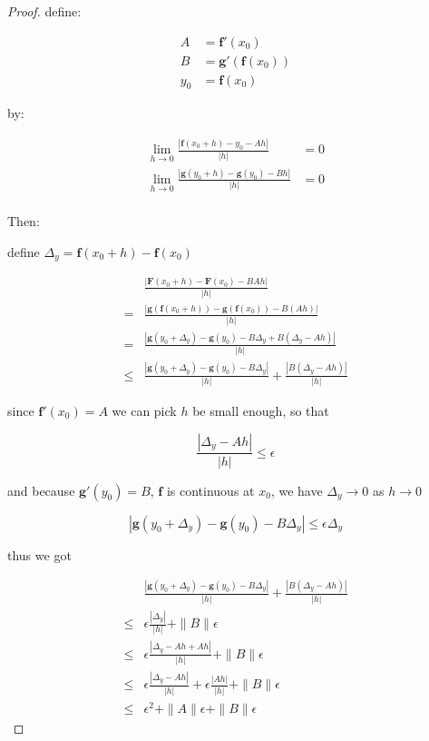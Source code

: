\begin{proof}
    define:
    
    \begin{align*}
        A &= \mathbf{f}'(x_0) \\
        B &= \mathbf{g}'(\mathbf{f}(x_0)) \\
        y_0 &= \mathbf{f}(x_0)
    \end{align*}

    by:

    \begin{align*}
        \lim_{h \to 0} \frac{\left| \mathbf{f}(x_0 + h) - y_0 - Ah \right|}{|h|} &= 0 \\
        \lim_{h \to 0} \frac{\left| \mathbf{g}(y_0 + h) - \mathbf{g}(y_0) - Bh \right|}{|h|} &= 0 \\
    \end{align*}

    Then:

    define $\Delta_y = \mathbf{f}(x_0 + h) - \mathbf{f}(x_0)$

    \begin{align*}
        &\frac{\left|\mathbf{F}(x_0 + h) - \mathbf{F}(x_0) - BA h\right|}{|h|}\\
        =& \frac{\left| \mathbf{g}(\mathbf{f}(x_0 + h)) - \mathbf{g}(\mathbf{f}(x_0))- B(Ah)\right|}{|h|}  \\
        =& \frac{\left| \mathbf{g}(y_0 + \Delta_y) - \mathbf{g}(y_0)- B \Delta_y + B(\Delta_y-Ah)\right|}{\left| h \right|}  \\
        \le &  \frac{\left| \mathbf{g}(y_0 + \Delta_y) - \mathbf{g}(y_0)- B \Delta_y \right|}{\left| h \right|} + \frac{\left|  B \left(\Delta_y -Ah \right) \right|}{\left| h \right|}
    \end{align*}

    since $\mathbf{f}'(x_0) = A $ we can pick $h$ be small enough, so that 

    \[
\frac{\left| \Delta_y -Ah  \right|}{\left| h \right|} \le \epsilon
    \]

    and because $\mathbf{g'}(y_0) = B$, $\mathbf{f}$ is continuous at $x_0$, we have $\Delta_y \to 0$ as $h \to 0$

    \[
\left| \mathbf{g}(y_0 + \Delta_y) - \mathbf{g}(y_0)- B \Delta_y \right| \le \epsilon \Delta_y 
    \]

    thus we got

    \begin{align*}
        &\frac{\left| \mathbf{g}(y_0 + \Delta_y) - \mathbf{g}(y_0)- B \Delta_y \right|}{\left| h \right|} + \frac{\left|  B \left(\Delta_y -Ah \right) \right|}{\left| h \right|} \\
        \le & \epsilon \frac{|\Delta_y|}{|h|} + \| B\| \epsilon \\
        \le &\epsilon \frac{|\Delta_y - Ah + Ah|}{|h|} + \| B\| \epsilon \\
        \le &\epsilon \frac{|\Delta_y - Ah|}{|h|} +\epsilon \frac{|Ah|}{|h|} + \| B\| \epsilon \\
        \le & \epsilon^2 + \| A\| \epsilon + \| B\| \epsilon
    \end{align*}


\end{proof}
